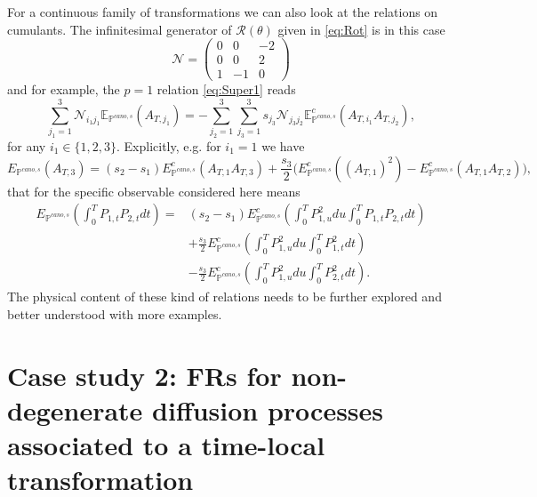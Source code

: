 \documentclass[a4paper,11pt]{article}
\numberwithin{equation}{section}
\begin{document}
For a continuous family of transformations we can also look at the relations on cumulants. 
The infinitesimal generator of  $\mathcal{R}\left(\theta\right)$ given in  \eqref{eq:Rot} is in this case 
\[
\mathcal{N}=\left(\begin{array}{ccc}
0 & 0 & -2\\
0 & 0 & 2\\
1 & -1 & 0
\end{array}\right)
\]
and for example, the $p=1$ relation \eqref{eq:Super1} reads
\begin{equation}
\sum_{j_{1}=1}^{3}\mathcal{N}_{i_{1}j_{1}}\mathbb{E}_{\mathbb{P}^{cano,s}}\left(A_{T,j_{1}}\right)=-\sum_{j_{2}=1}^{3}\sum_{j_{3}=1}^{3}s_{j_{3}}\mathcal{N}_{j_{3}j_{2}}\mathbb{E}_{\mathbb{P}^{cano,s}}^{c}\left(A_{T,i_{1}}A_{T,j_{2}}\right),
\end{equation}
for any $ i_1 \in \{1,2,3 \} $.
Explicitly, e.g. for $i_1=1$ we have
\begin{equation*}
{E}_{\mathbb{P}^{cano,s}}\left(A_{T,3}\right)= (s_2-s_1){E}_{\mathbb{P}^{cano,s}}^c \left(A_{T,1}A_{T,3}\right) + \frac{s_3}{2} \Big( {E}^c_{\mathbb{P}^{cano,s}} \left((A_{T,1})^2\right) - {E}^c_{\mathbb{P}^{cano,s}} \left(A_{T,1}A_{T,2}\right) \Big),
\end{equation*}
that for the specific observable considered here means
\begin{align}
   {E}_{\mathbb{P}^{cano,s}}\left(\int_0^T P_{1,t}P_{2,t} dt\right) =& (s_2-s_1){E}_{\mathbb{P}^{cano,s}}^c \left(\int_0^T P^2_{1,u} du\int_0^T P_{1,t}P_{2,t} dt\right) \nonumber\\
   &+ \frac{s_3}{2}  {E}^c_{\mathbb{P}^{cano,s}} \left(\int_0^T P^2_{1,u} du \int_0^T P^2_{1,t} dt\right) \nonumber\\
   &- \frac{s_3}{2} {E}^c_{\mathbb{P}^{cano,s}} \left(\int_0^T P^2_{1,u} du \int_0^T P^2_{2,t} dt\right) .
\end{align}
The physical content of these kind of relations needs to be further explored and better understood with more examples.






\section{Case study 2: FRs for non-degenerate diffusion processes associated to a time-local transformation}
\label{sec:Markovian}
\end{document}
